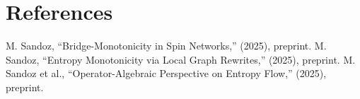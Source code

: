 \documentclass[11pt]{article}
\theoremstyle{plain}
\theoremstyle{definition}
\begin{document}
\section*{References}
\begin{thebibliography}{99}
   M. Sandoz, ``Bridge-Monotonicity in Spin Networks,'' (2025), preprint.
   M. Sandoz, ``Entropy Monotonicity via Local Graph Rewrites,'' (2025), preprint.
   M. Sandoz et al., ``Operator-Algebraic Perspective on Entropy Flow,'' (2025), preprint.
\end{thebibliography}
\end{document}
